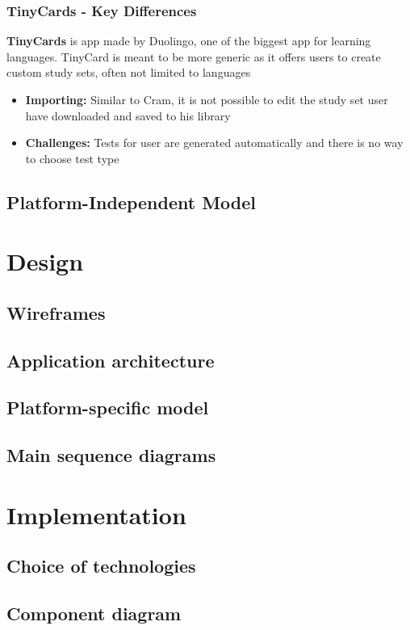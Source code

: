 \documentclass[thesis=B,english]{FITthesis}[2012/10/20]
\begin{document}
\subsection{TinyCards - Key Differences}

\textbf{TinyCards} is app made by Duolingo, one of the biggest app for learning languages. TinyCard is meant to be more generic as it offers users to create custom study sets, often not limited to languages
	\begin{itemize}
		\item \textbf{Importing:} Similar to Cram, it is not possible to edit the study set user have downloaded and saved to his library
		\item \textbf{Challenges:} Tests for user are generated automatically and there is no way to choose test type
	\end{itemize}
	

\section{Platform-Independent Model}


\chapter{Design}
\section{Wireframes}
\section{Application architecture}
\section{Platform-specific model}
\section{Main sequence diagrams}

\chapter{Implementation}
\section{Choice of technologies}
\section{Component diagram}
\end{document}
